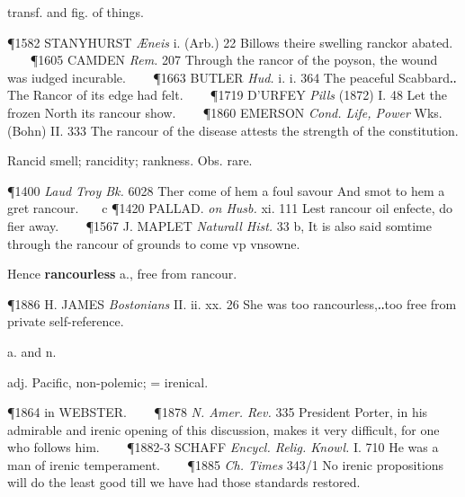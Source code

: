 \begin{description}[wide, labelwidth=!, labelindent=0pt]
\begin{myenumerate}
 transf. and fig. of things.

\P 1582 STANYHURST  \textit{Æneis} i. (Arb.) 22 Billows theire swelling ranckor abated.    
\P 1605 CAMDEN  \textit{Rem.} 207 Through the rancor of the poyson, the wound was iudged incurable.    
\P 1663 BUTLER \textit{Hud.} i. i. 364 The peaceful Scabbard‥The Rancor of its edge had felt.    
\P 1719 D'URFEY  \textit{Pills} (1872) I. 48 Let the frozen North its rancour show.    
\P 1860 EMERSON  \textit{Cond. Life, Power} Wks. (Bohn) II. 333 The rancour of the disease attests the strength of the constitution.

 Rancid smell; rancidity; rankness. Obs. rare.

\P 1400  \textit{Laud Troy Bk.} 6028 Ther come of hem a foul savour And smot to hem a gret rancour.    c 
\P 1420 PALLAD.  \textit{on Husb.} xi. 111 Lest rancour oil enfecte, do fier away.    
\P 1567 J. MAPLET  \textit{Naturall Hist.} 33 b, It is also said somtime through the rancour of grounds to come vp vnsowne.

\noindent Hence \textbf{rancourless} a., free from rancour.

\P 1886 H. JAMES  \textit{Bostonians} II. ii. xx. 26 She was too rancourless,‥too free from private self-reference.
\end{myenumerate}


 a. and n.

\noindent {}

\vspace{-0.3cm}

\begin{myenumerate}

 adj. Pacific, non-polemic; = irenical.

\P 1864 in  WEBSTER.    
\P 1878 \textit{N. Amer.  Rev.} 335 President Porter, in his admirable and irenic opening of this discussion, makes it very difficult, for one who follows him.    
\P 1882-3 SCHAFF \textit{Encycl. Relig. Knowl.} I. 710 He was a man of irenic temperament.    
\P 1885 \textit{Ch. Times}  343/1 No irenic propositions will do the least good till we have had those standards restored.


\end{myenumerate}
\end{description}
